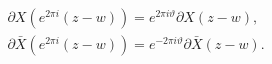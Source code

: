 \begin{equation}
\label{mono}
\begin{array}{l}
\partial X(e^{2 \pi i}(z-w))=e^{2\pi i\vartheta}\partial X(z-w), \\
\partial \bar{X}(e^{2 \pi i}(z-w))=e^{-2\pi i\vartheta }\partial \bar{X}(z-w).
\end{array}
\end{equation}

